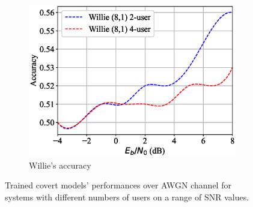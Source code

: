 \begin{figure}[tp!]
\begin{subfigure}{0.28\textwidth}
		\includegraphics[width=\linewidth]{figs/multi_willie_accuracy_awgn}
		\caption{Willie's accuracy}	
		\label{fig:multi_awgn_results_willie}
	\end{subfigure}
	\caption{Trained covert models' performances over AWGN channel for systems with different numbers of users on a range of SNR values.}
	\label{fig:multi_awgn_results}
\end{figure}
